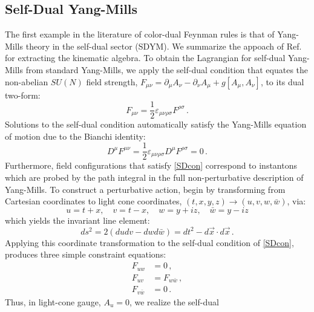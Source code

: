 \documentclass[11pt,letter]{article}
\begin{document}
\subsection{Self-Dual Yang-Mills} The first example in the literature
of color-dual Feynman rules is that of Yang-Mills theory in the
self-dual sector (SDYM).  We summarize the appoach of
Ref.~\cite{Monteiro2011pc} for extracting the kinematic algebra.
To obtain the Lagrangian for self-dual Yang-Mills from standard Yang-Mills, we apply the
self-dual condition that equates the non-abelian $SU(N)$ field
strength,
$F_{\mu\nu} = \partial_\mu A_\nu -\partial_\nu A_\mu + g[A_\mu
,A_\nu]$, to its dual two-form:
\begin{equation}
  \label{SDcon} F_{\mu\nu} = \frac{1}{2}
  \varepsilon_{\mu\nu\rho\sigma}F^{\rho\sigma} \,.
\end{equation}
Solutions to the self-dual condition automatically satisfy the
Yang-Mills equation of motion due to the Bianchi identity:
\begin{equation}
D^\mu F^{\mu\nu} = \frac{1}{2} \varepsilon_{\mu\nu\rho\sigma}D^\mu F^{\rho\sigma} = 0 \,.
\end{equation}
Furthermore, field configurations that satisfy \cref{SDcon} correspond to instantons which are probed by the path integral in the full non-perturbative description of Yang-Mills. To construct a perturbative action, begin by
transforming from Cartesian coordinates to light cone coordinates,
$(t,x,y,z) \rightarrow (u,v,w,\bar{w})$, via:
\begin{equation}
u = t+x,\quad v=t-x, \quad w = y+iz, \quad \bar{w} = y-iz
\end{equation}
which yields the invariant line element:
\begin{equation}
ds^2 = 2(dudv - dwd\bar{w}) = dt^2 - d\vec{x}\cdot d\vec{x} \,.
\end{equation}
Applying this coordinate transformation to the self-dual condition of
\cref{SDcon}, produces three simple constraint equations:
\begin{align} \label{SDLightCone1}
F_{uw} &=0\,,
\\
 \label{SDLightCone2}
 F_{uv} &= F_{w\bar{w}}\,,
\\
 \label{SDLightCone3}
 F_{v\bar{w}} &= 0\,.
\end{align}
Thus, in light-cone gauge, $A_u=0$, we realize the self-dual
\end{document}
